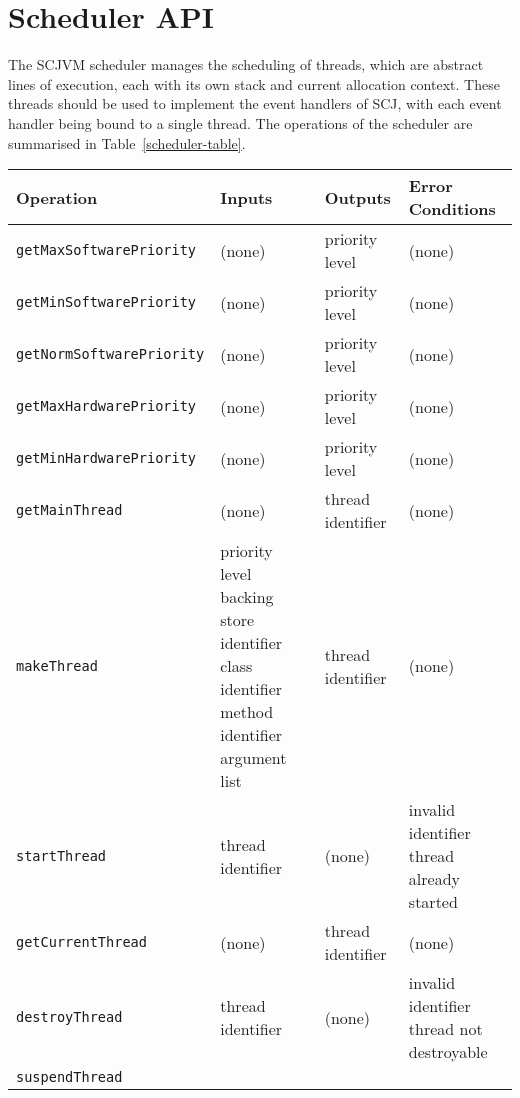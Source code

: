 \documentclass[a4paper,10pt]{report}
\begin{document}
\section{Scheduler API}
\label{scheduler-section}

The SCJVM scheduler manages the scheduling of threads, which are
abstract lines of execution, each with its own stack and current
allocation context.
These threads should be used to implement the event handlers of SCJ,
with each event handler being bound to a single thread.
The operations of the scheduler are summarised in
Table~\ref{scheduler-table}.

\begin{table*}[ht]
  \centering
  \footnotesize
  \begin{tabular}{|l|p{3.2cm}|p{2.3cm}|p{3.6cm}|}
    Operation & Inputs & Outputs & Error Conditions \\
    \hline
    \texttt{getMaxSoftwarePriority} &
    (none) &
    priority level &
    (none)
    \\\texttt{getMinSoftwarePriority} &
    (none) &
    priority level &
    (none)
    \\\texttt{getNormSoftwarePriority} &
    (none) &
    priority level &
    (none)
    \\\texttt{getMaxHardwarePriority} &
    (none) &
    priority level &
    (none)
    \\\texttt{getMinHardwarePriority} &
    (none) &
    priority level &
    (none)
    \\\texttt{getMainThread} &
    (none) &
    thread identifier &
    (none)
    \\\texttt{makeThread} &
    priority level \newline
    backing store identifier \newline
    class identifier \newline
    method identifier \newline 
    argument list &
    thread identifier &
    (none)
    \\\texttt{startThread} &
    thread identifier &
    (none) &
    invalid identifier \newline
    thread already started
    \\\texttt{getCurrentThread} &
    (none) &
    thread identifier &
    (none)
    \\\texttt{destroyThread} &
    thread identifier &
    (none) &
    invalid identifier \newline
    thread not destroyable
    \\\texttt{suspendThread} &

\end{tabular}
\end{table*}
\end{document}
